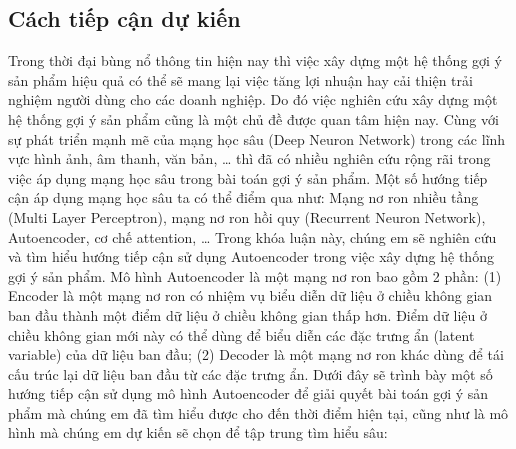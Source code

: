 \documentclass{article}[14pt]
\begin{document}
{    \subsection{Cách tiếp cận dự kiến}
    

    Trong thời đại bùng nổ thông tin hiện nay thì việc xây dựng một hệ thống gợi 
    ý sản phẩm hiệu quả có thể sẽ mang lại việc tăng lợi nhuận hay cải thiện trải 
    nghiệm người dùng cho các doanh nghiệp. Do đó việc nghiên cứu xây dựng một hệ 
    thống gợi ý sản phẩm cũng là một chủ đề được quan tâm hiện nay. Cùng với sự 
    phát triển mạnh mẽ của mạng học sâu (Deep Neuron Network) trong các lĩnh vực 
    hình ảnh, âm thanh, văn bản, … thì đã có nhiều nghiên cứu rộng rãi trong việc 
    áp dụng mạng học sâu trong bài toán gợi ý sản phẩm. Một số hướng tiếp cận áp 
    dụng mạng học sâu ta có thể điểm qua như: Mạng nơ ron nhiều tầng (Multi Layer 
    Perceptron), mạng nơ ron hồi quy (Recurrent Neuron Network), Autoencoder, cơ chế attention, … 
    Trong khóa luận này, chúng em sẽ nghiên cứu và tìm hiểu hướng tiếp cận sử 
    dụng Autoencoder trong việc xây dựng hệ thống gợi ý sản phẩm. Mô hình 
    Autoencoder là một mạng nơ ron bao gồm 2 phần: (1) Encoder là một mạng nơ ron 
    có nhiệm vụ biểu diễn dữ liệu ở chiều không gian ban đầu thành một điểm dữ 
    liệu ở chiều không gian thấp hơn. Điểm dữ liệu ở chiều không gian mới này có 
    thể dùng để biểu diễn các đặc trưng ẩn (latent variable) của dữ liệu ban đầu; 
    (2) Decoder là một mạng nơ ron khác dùng để tái cấu trúc lại dữ liệu ban đầu 
    từ các đặc trưng ẩn.
    Dưới đây sẽ trình bày một số hướng tiếp cận sử dụng mô hình Autoencoder để 
    giải quyết bài toán gợi ý sản phẩm mà chúng em đã tìm hiểu được cho đến thời 
    điểm hiện tại, cũng như là mô hình mà chúng em dự kiến sẽ chọn để tập trung 
    tìm hiểu sâu:
    
    
    
}
\end{document}
